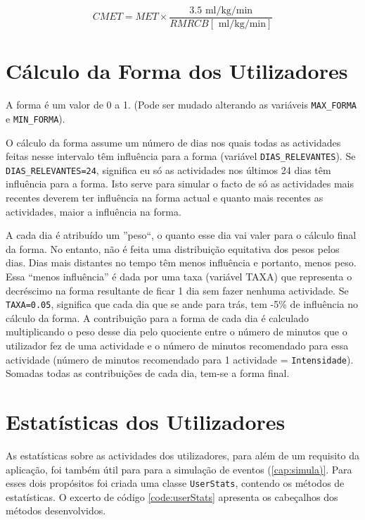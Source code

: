 \documentclass[a4paper,10pt]{report}
\begin{document}
\begin{equation} \label{eq:CMET} 
CMET = MET \times \frac{3.5 \text{ ml/kg/min}}{RMRCB [\text{ ml/kg/min}]}
\end{equation}

\chapter{Cálculo da Forma dos Utilizadores}
\label{cap:forma}
A forma é um valor de 0 a 1. (Pode ser mudado alterando as variáveis \verb!MAX_FORMA! e \verb!MIN_FORMA!).

O cálculo da forma assume um número de dias nos quais todas as actividades feitas nesse intervalo têm influência para a forma 
(variável \verb!DIAS_RELEVANTES!). Se \verb!DIAS_RELEVANTES=24!, significa eu só as actividades nos últimos 24 dias têm influência para a forma.  
Isto serve para simular o facto de só as actividades mais recentes deverem ter influência na forma actual e quanto mais recentes as 
actividades, maior a influência na forma.

A cada dia é atribuído um ''peso``, o quanto esse dia vai valer para o cálculo final da forma. 
No entanto, não é feita uma distribuição equitativa dos pesos pelos dias. Dias mais distantes no tempo têm menos influência e portanto, 
menos peso. Essa “menos influência” é dada por uma taxa (variável TAXA) que representa o decréscimo na forma resultante de ficar 1 dia sem 
fazer nenhuma actividade. Se \verb!TAXA=0.05!, significa que cada dia que se ande para trás, tem -5\% de influência no cálculo da forma.
A contribuição para a forma de cada dia é calculado multiplicando o peso desse dia pelo quociente entre o número de minutos que o utilizador 
fez de uma actividade e o número de minutos recomendado para essa actividade (número de minutos recomendado para 1 actividade = \verb!Intensidade!). 
Somadas todas as contribuições de cada dia, tem-se a forma final.

\chapter{Estatísticas dos Utilizadores}
\label{cap:estatisticas}
As estatísticas sobre as actividades dos utilizadores, para além de um requisito da aplicação, 
foi também útil para para a simulação de eventos (\ref{cap:simula)}. 
Para esses dois propósitos foi criada uma classe \verb!UserStats!, contendo os métodos de estatísticas. 
O excerto de código \ref{code:userStats} apresenta os cabeçalhos dos métodos desenvolvidos.
\end{document}
